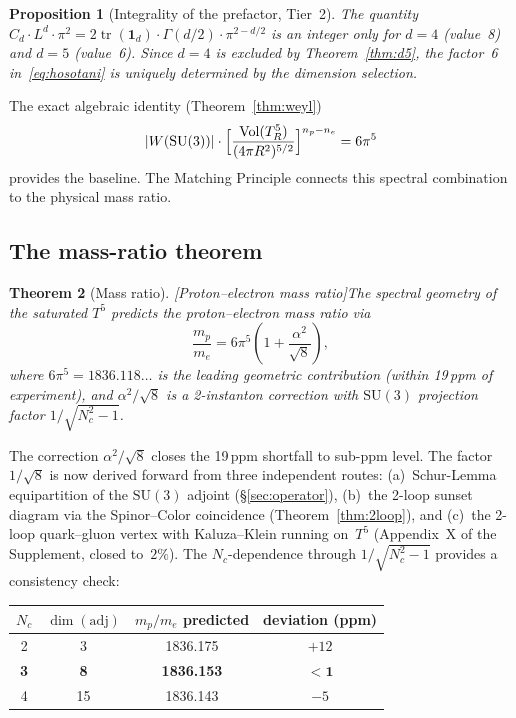 \documentclass[11pt,a4paper]{article}
\newtheorem{theorem}{Theorem}
\newtheorem{proposition}[theorem]{Proposition}
\theoremstyle{definition}
\theoremstyle{remark}
\begin{document}
\begin{proposition}[Integrality of the prefactor, Tier~2]\label{prop:six}
The quantity $C_d\cdot L^d\cdot\pi^2=2\operatorname{tr}(\mathbf{1}_d)
\cdot\Gamma(d/2)\cdot\pi^{2-d/2}$ is an integer only for $d=4$ (value~8)
and $d=5$ (value~6).  Since $d=4$ is excluded by Theorem~\ref{thm:d5},
the factor~6 in~\eqref{eq:hosotani} is uniquely determined by the
dimension selection.
\end{proposition}

The exact algebraic identity (Theorem~\ref{thm:weyl})
\[
  |W(\mathrm{SU}(3))|\cdot
  \Bigl[\frac{\mathrm{Vol}(T^5_R)}{(4\pi R^2)^{5/2}}\Bigr]^{n_p-n_e}
  = 6\pi^5
\]
provides the baseline.  The Matching Principle connects
this spectral combination to the physical mass ratio.

\subsection{The mass-ratio theorem}

\begin{theorem}[Mass ratio][Proton--electron mass ratio]\label{conj:V1}
The spectral geometry of the saturated $T^5$ predicts the
proton--electron mass ratio via
\begin{equation}\label{eq:V1}
  \frac{m_p}{m_e} = 6\pi^5\!\left(1+\frac{\alpha^2}{\sqrt{8}}\right),
\end{equation}
where $6\pi^5=1836.118\ldots$ is the leading geometric contribution
(within 19\,ppm of experiment), and $\alpha^2/\sqrt{8}$ is a 2-instanton
correction with $\mathrm{SU}(3)$ projection factor $1/\sqrt{N_c^2-1}$.
\end{theorem}

The correction $\alpha^2/\sqrt{8}$ closes the 19\,ppm shortfall to
sub-ppm level.  The factor $1/\sqrt{8}$ is now derived forward from
three independent routes: (a)~Schur-Lemma equipartition of the
$\mathrm{SU}(3)$ adjoint (\S\ref{sec:operator}), (b)~the 2-loop
sunset diagram via the Spinor--Color coincidence
(Theorem~\ref{thm:2loop}), and (c)~the 2-loop quark--gluon vertex
with Kaluza--Klein running on~$T^5$ (Appendix~X of the Supplement,
closed to~$2\%$).  The $N_c$-dependence through
$1/\sqrt{N_c^2-1}$ provides a consistency check:

\begin{center}
\renewcommand{\arraystretch}{1.1}
\begin{tabular}{cccc}
\toprule
$N_c$ & $\dim(\mathrm{adj})$ & $m_p/m_e$ predicted & deviation (ppm)\\
\midrule
2 & 3 & 1836.175 & $+12$\\
\textbf{3} & \textbf{8} & \textbf{1836.153} & $\mathbf{<1}$\\
4 & 15 & 1836.143 & $-5$\\
\bottomrule
\end{tabular}
\end{center}
\end{document}
